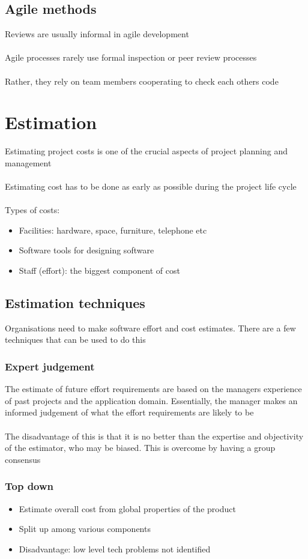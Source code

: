 \documentclass{article}[18pt]
\begin{document}
\subsection{Agile methods}
Reviews are usually informal in agile development\\
\\
Agile processes rarely use formal inspection or peer review processes\\
\\
Rather, they rely on team members cooperating to check each others code
\section{Estimation}
Estimating project costs is one of the crucial aspects of project planning and management\\
\\
Estimating cost has to be done as early as possible during the project life cycle\\
\\
Types of costs:
\begin{itemize}
	\item Facilities: hardware, space, furniture, telephone etc
	\item Software tools for designing software
	\item Staff (effort): the biggest component of cost
\end{itemize}
\subsection{Estimation techniques}
Organisations need to make software effort and cost estimates. There are a few techniques that can be used to do this
\subsubsection{Expert judgement}
The estimate of future effort requirements are based on the managers experience of past projects and the application domain. Essentially, the manager makes an informed judgement of what the effort requirements are likely to be\\
\\
The disadvantage of this is that it is no better than the expertise and objectivity of the estimator, who may be biased. This is overcome by having a group consensus
\subsubsection{Top down}
\begin{itemize}
	\item Estimate overall cost from global properties of the product
	\item Split up among various components
	\item Disadvantage: low level tech problems not identified
\end{itemize}
\end{document}
